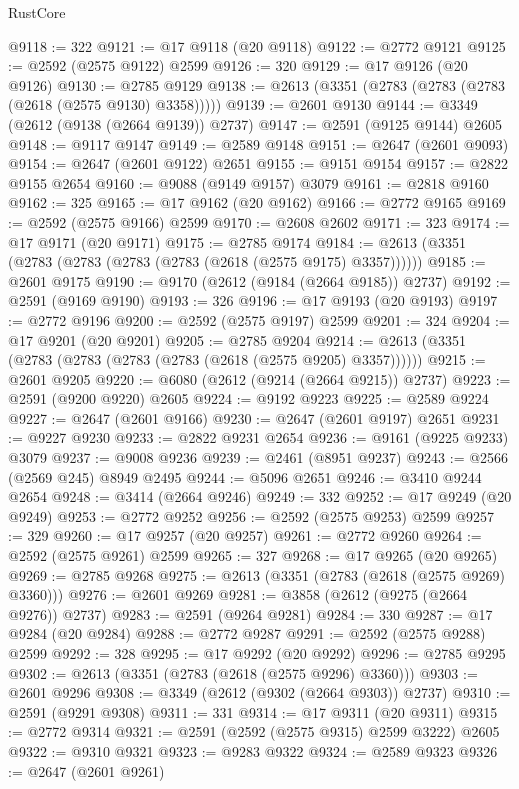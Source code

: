 \begin{lexlean}{RustCore}
\begin{coremodule}
@9118 := 322
@9121 := @17 @9118 (@20 @9118)
@9122 := @2772 @9121
@9125 := @2592 (@2575 @9122) @2599
@9126 := 320
@9129 := @17 @9126 (@20 @9126)
@9130 := @2785 @9129
@9138 := @2613 (@3351 (@2783 (@2783 (@2783 (@2618 (@2575 @9130) @3358)))))
@9139 := @2601 @9130
@9144 := @3349 (@2612 (@9138 (@2664 @9139)) @2737)
@9147 := @2591 (@9125 @9144) @2605
@9148 := @9117 @9147
@9149 := @2589 @9148
@9151 := @2647 (@2601 @9093)
@9154 := @2647 (@2601 @9122) @2651
@9155 := @9151 @9154
@9157 := @2822 @9155 @2654
@9160 := @9088 (@9149 @9157) @3079
@9161 := @2818 @9160
@9162 := 325
@9165 := @17 @9162 (@20 @9162)
@9166 := @2772 @9165
@9169 := @2592 (@2575 @9166) @2599
@9170 := @2608 @2602
@9171 := 323
@9174 := @17 @9171 (@20 @9171)
@9175 := @2785 @9174
@9184 := @2613 (@3351 (@2783 (@2783 (@2783 (@2783 (@2618 (@2575 @9175) @3357))))))
@9185 := @2601 @9175
@9190 := @9170 (@2612 (@9184 (@2664 @9185)) @2737)
@9192 := @2591 (@9169 @9190)
@9193 := 326
@9196 := @17 @9193 (@20 @9193)
@9197 := @2772 @9196
@9200 := @2592 (@2575 @9197) @2599
@9201 := 324
@9204 := @17 @9201 (@20 @9201)
@9205 := @2785 @9204
@9214 := @2613 (@3351 (@2783 (@2783 (@2783 (@2783 (@2618 (@2575 @9205) @3357))))))
@9215 := @2601 @9205
@9220 := @6080 (@2612 (@9214 (@2664 @9215)) @2737)
@9223 := @2591 (@9200 @9220) @2605
@9224 := @9192 @9223
@9225 := @2589 @9224
@9227 := @2647 (@2601 @9166)
@9230 := @2647 (@2601 @9197) @2651
@9231 := @9227 @9230
@9233 := @2822 @9231 @2654
@9236 := @9161 (@9225 @9233) @3079
@9237 := @9008 @9236
@9239 := @2461 (@8951 @9237)
@9243 := @2566 (@2569 @245) @8949 @2495
@9244 := @5096 @2651
@9246 := @3410 @9244 @2654
@9248 := @3414 (@2664 @9246)
@9249 := 332
@9252 := @17 @9249 (@20 @9249)
@9253 := @2772 @9252
@9256 := @2592 (@2575 @9253) @2599
@9257 := 329
@9260 := @17 @9257 (@20 @9257)
@9261 := @2772 @9260
@9264 := @2592 (@2575 @9261) @2599
@9265 := 327
@9268 := @17 @9265 (@20 @9265)
@9269 := @2785 @9268
@9275 := @2613 (@3351 (@2783 (@2618 (@2575 @9269) @3360)))
@9276 := @2601 @9269
@9281 := @3858 (@2612 (@9275 (@2664 @9276)) @2737)
@9283 := @2591 (@9264 @9281)
@9284 := 330
@9287 := @17 @9284 (@20 @9284)
@9288 := @2772 @9287
@9291 := @2592 (@2575 @9288) @2599
@9292 := 328
@9295 := @17 @9292 (@20 @9292)
@9296 := @2785 @9295
@9302 := @2613 (@3351 (@2783 (@2618 (@2575 @9296) @3360)))
@9303 := @2601 @9296
@9308 := @3349 (@2612 (@9302 (@2664 @9303)) @2737)
@9310 := @2591 (@9291 @9308)
@9311 := 331
@9314 := @17 @9311 (@20 @9311)
@9315 := @2772 @9314
@9321 := @2591 (@2592 (@2575 @9315) @2599 @3222) @2605
@9322 := @9310 @9321
@9323 := @9283 @9322
@9324 := @2589 @9323
@9326 := @2647 (@2601 @9261)

\end{coremodule}
\end{lexlean}
